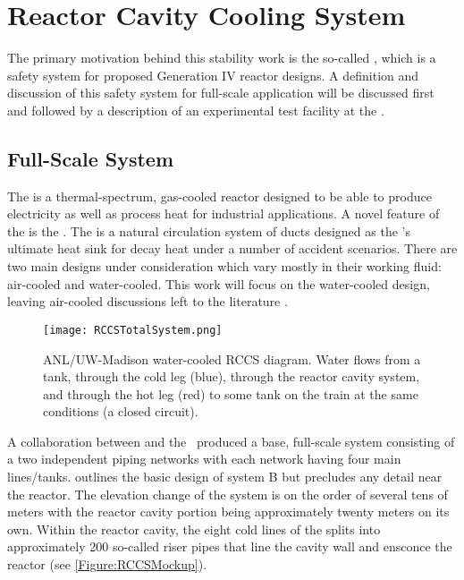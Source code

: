 \section{Reactor Cavity Cooling System}\label{Section:RCCS}
The primary motivation behind this stability work is the so-called , which is a safety system for proposed Generation IV reactor designs.
A definition and discussion of this safety system for full-scale application will be discussed first and followed by a description of an experimental test facility at the \TheUniversity.

\subsection{Full-Scale System}
The  is a thermal-spectrum, gas-cooled reactor designed to be able to produce electricity as well as process heat for industrial applications.
A novel feature of the  is the .
The  is a natural circulation system of ducts designed as the 's ultimate heat sink for decay heat under a number of accident scenarios.
There are two main designs under consideration which vary mostly in their working fluid: air-cooled and water-cooled.
This work will focus on the water-cooled  design, leaving air-cooled discussions left to the literature \cite{bechtelnationalinc._450_1993,generalatomics_gas_1996}.
\begin{figure}%
\centering
    \caption[ANL/UW-Madison water-cooled RCCS diagram]{   ANL/UW-Madison  water-cooled RCCS diagram.  
                Water flows from a tank, through the cold leg (blue), through the reactor cavity system, and through the hot leg (red) to some tank on the train at the same conditions (a closed circuit).}%
    \label{Figure:RCCSTotalSystem}%
    \texttt{[image: RCCSTotalSystem.png]}%
\end{figure}
A collaboration between  and the \TheUniversity\ produced a base, full-scale  system consisting of a two independent piping networks with each network having four main lines/tanks.
 outlines the basic design of system B but precludes any detail near the reactor.
The elevation change of the system is on the order of several tens of meters with the reactor cavity portion being approximately twenty meters on its own.
Within the reactor cavity, the eight cold lines of the  splits into approximately 200 so-called riser pipes that line the cavity wall and ensconce the reactor (see \cref{Figure:RCCSMockup}).
